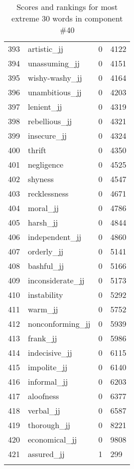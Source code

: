 \begin{longtable}[!htbp]{| rlr@{.}l |}
    393 & artistic\_jj & 0 & 4122 \\
    394 & unassuming\_jj & 0 & 4151 \\
    395 & wishy-washy\_jj & 0 & 4164 \\
    396 & unambitious\_jj & 0 & 4203 \\
    397 & lenient\_jj & 0 & 4319 \\
    398 & rebellious\_jj & 0 & 4321 \\
    399 & insecure\_jj & 0 & 4324 \\
    400 & thrift & 0 & 4350 \\
    401 & negligence & 0 & 4525 \\
    402 & shyness & 0 & 4547 \\
    403 & recklessness & 0 & 4671 \\
    404 & moral\_jj & 0 & 4786 \\
    405 & harsh\_jj & 0 & 4844 \\
    406 & independent\_jj & 0 & 4860 \\
    407 & orderly\_jj & 0 & 5141 \\
    408 & bashful\_jj & 0 & 5166 \\
    409 & inconsiderate\_jj & 0 & 5173 \\
    410 & instability & 0 & 5292 \\
    411 & warm\_jj & 0 & 5752 \\
    412 & nonconforming\_jj & 0 & 5939 \\
    413 & frank\_jj & 0 & 5986 \\
    414 & indecisive\_jj & 0 & 6115 \\
    415 & impolite\_jj & 0 & 6140 \\
    416 & informal\_jj & 0 & 6203 \\
    417 & aloofness & 0 & 6377 \\
    418 & verbal\_jj & 0 & 6587 \\
    419 & thorough\_jj & 0 & 8221 \\
    420 & economical\_jj & 0 & 9808 \\
    421 & assured\_jj & 1 & 299 \\
    \hline
    \caption{Scores and rankings for most extreme 30 words in component \#40} \\
\end{longtable}
